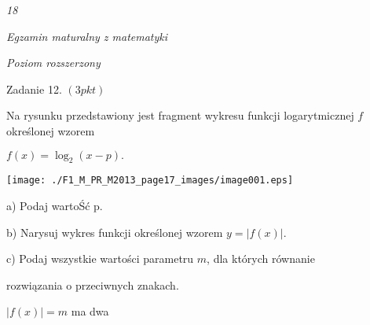 \documentclass[a4paper,12pt]{article}
\begin{document}
{\it 18}

{\it Egzamin maturalny z matematyki}

{\it Poziom rozszerzony}

Zadanie 12. $(3pkt)$

Na rysunku przedstawiony jest fragment wykresu funkcji logarytmicznej $f$ określonej wzorem

$f(x)=\log_{2}(x-p).$
\begin{center}
\texttt{[image: ./F1\_M\_PR\_M2013\_page17\_images/image001.eps]}
\end{center}
a) Podaj wartoŚć p.

b) Narysuj wykres funkcji określonej wzorem $y=|f(x)|.$

c) Podaj wszystkie wartości parametru $m$, dla których równanie

rozwiązania o przeciwnych znakach.

$|f(x)|=m$ ma dwa
\end{document}
